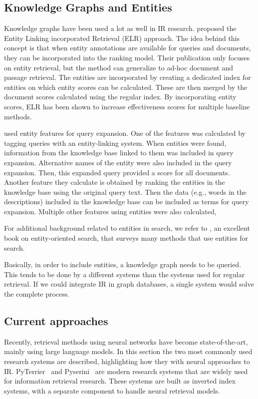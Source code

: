 \subsection{Knowledge Graphs and Entities}
Knowledge graphs have been used a lot as well in IR research.  proposed the Entity Linking incorporated Retrieval (ELR) approach. The idea behind this concept is that when entity annotations are available for queries and documents, they can be incorporated into the ranking model. Their publication only focuses on entity retrieval, but the method can generalize to ad-hoc document and passage retrieval. The entities are incorporated by creating a dedicated index for entities on which entity scores can be calculated. These are then merged by the document scores calculated using the regular index. By incorporating entity scores, ELR has been shown to increase effectiveness scores for multiple baseline methods. 

 used entity features for query expansion. One of the features was calculated by tagging queries with an entity-linking system. When entities were found, information from the knowledge base linked to them was included in query expansion. Alternative names of the entity were also included in the query expansion. Then, this expanded query provided a score for all documents. Another feature they calculate is obtained by ranking the entities in the knowledge base using the original query text. Then the data (e.g., words in the descriptions) included in the knowledge base can be included as terms for query expansion. Multiple other features using entities were also calculated, 

For additional background related to entities in search, we refer to , an excellent book on entity-oriented search, that surveys many methods that use entities for search. 

Basically, in order to include entities, a knowledge graph needs to be queried. This tends to be done by a different systems than the systems used for regular retrieval. If we could integrate IR in graph databases, a single system would solve the complete process.

\subsection{Current approaches}
Recently, retrieval methods using neural networks have become state-of-the-art, mainly using large language models. In this section the two most commonly used research systems are described, highlighting how they with neural approaches to IR.
PyTerrier~\citep{pyterrier} and Pyserini~\citep{pyserini} are modern research systems that are widely used for information retrieval research. These systems are built as inverted index systems, with a separate component to handle neural retrieval models. 

